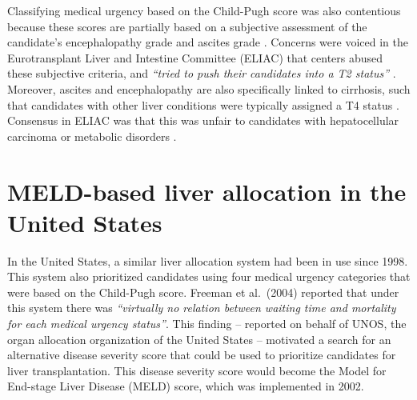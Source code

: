 \documentclass[11pt,twoside,]{book}
\begin{document}
Classifying medical urgency based on the Child-Pugh score was also contentious
because these scores are partially based on a subjective assessment of the candidate's
encephalopathy grade and ascites grade \citep{Jung2008, wiesnerModelEndstageLiver2003}.
Concerns were voiced in the Eurotransplant Liver and Intestine Committee (ELIAC)
that centers abused these subjective criteria, and \emph{``tried to push their candidates into
a T2 status''} \citep{minutesELIACMeeting2006}. Moreover, ascites and encephalopathy
are also specifically linked to cirrhosis, such that candidates with
other liver conditions were typically assigned a T4 status \citep{Strassburg2004}.
Consensus in ELIAC was that this was unfair to candidates with hepatocellular
carcinoma or metabolic disorders \citep{minutesELIACMeeting2001}.

\section{MELD-based liver allocation in the United States}\label{meld-based-liver-allocation-in-the-united-states}

In the United States, a similar liver allocation system had been in use since 1998.
This system also prioritized candidates using four medical urgency categories
that were based on the Child-Pugh score. Freeman et al.~(2004) reported that
under this system there was \emph{``virtually no relation between waiting time and
mortality for each medical urgency status''}. This finding -- reported on behalf
of UNOS, the organ allocation organization of the United States -- motivated a
search for an alternative disease severity score that could be used to prioritize
candidates for liver transplantation. This disease severity score would become
the Model for End-stage Liver Disease (MELD) score, which was implemented in 2002.
\end{document}
